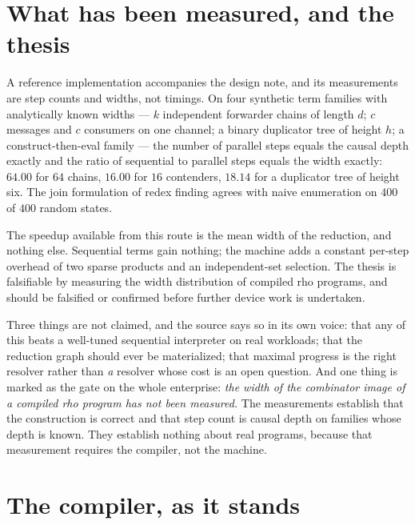 \section{What has been measured, and the thesis}
\label{cb:sec:measured}

A reference implementation accompanies the design note, and its measurements are step
counts and widths, not timings. On four synthetic term families with analytically known
widths --- $k$ independent forwarder chains of length $d$; $c$ messages and $c$ consumers
on one channel; a binary duplicator tree of height $h$; a construct-then-eval family ---
the number of parallel steps equals the causal depth exactly and the ratio of sequential
to parallel steps equals the width exactly: $64.00$ for $64$ chains, $16.00$ for $16$
contenders, $18.14$ for a duplicator tree of height six. The join formulation of redex
finding agrees with naive enumeration on $400$ of $400$ random states.

\begin{principle}
\label{cb:prin:width}
The speedup available from this route is the mean width of the reduction, and nothing
else. Sequential terms gain nothing; the machine adds a constant per-step overhead of two
sparse products and an independent-set selection. The thesis is falsifiable by measuring
the width distribution of compiled rho programs, and should be falsified or confirmed
before further device work is undertaken.
\end{principle}

Three things are not claimed, and the source says so in its own voice: that any of this
beats a well-tuned sequential interpreter on real workloads; that the reduction graph should
ever be materialized; that maximal progress is the right resolver rather than \emph{a}
resolver whose cost is an open question. And one thing is marked as the gate on the whole
enterprise: \emph{the width of the combinator image of a compiled rho program has not been
measured.} The measurements establish that the construction is correct and that step
count is causal depth on families whose depth is known. They establish nothing about real
programs, because that measurement requires the compiler, not the machine.

\section{The compiler, as it stands}
\label{cb:sec:saphire}


